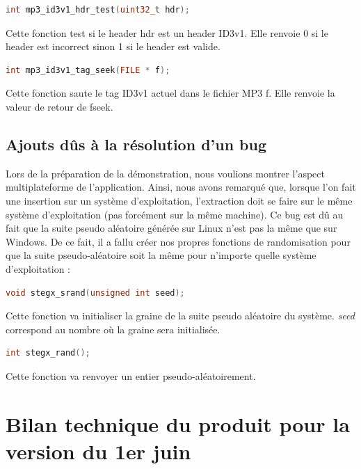 \documentclass[11pt]{article}
\begin{document}
\begin{lstlisting}[language=c]
int mp3_id3v1_hdr_test(uint32_t hdr);
\end{lstlisting}

Cette fonction test si le header hdr est un header ID3v1. Elle renvoie 0 
si le header est incorrect sinon 1 si le header est valide. 

\begin{lstlisting}[language=c]
int mp3_id3v1_tag_seek(FILE * f);
\end{lstlisting}

Cette fonction saute le tag ID3v1 actuel dans le fichier MP3 f. Elle renvoie 
la valeur de retour de fseek. 

\subsection{Ajouts dûs à la résolution d'un bug}

Lors de la préparation de la démonstration, nous voulions montrer l'aspect 
multiplateforme de l'application. 
Ainsi, nous avons remarqué que, lorsque l'on fait une insertion sur un 
système d'exploitation, l'extraction doit se faire sur le même système
d'exploitation (pas forcément sur la même machine). 
Ce bug est dû au fait que la suite pseudo aléatoire générée sur Linux n'est 
pas la même que sur Windows. 
De ce fait, il a fallu créer nos propres fonctions de randomisation pour que 
la suite pseudo-aléatoire soit la même pour n'importe quelle système d'exploitation : 

\begin{lstlisting}[language=c]
void stegx_srand(unsigned int seed);
\end{lstlisting}

Cette fonction va initialiser la graine de la suite pseudo aléatoire du 
système. \textit{seed} correspond au nombre où la graine sera initialisée.
\newline 

\begin{lstlisting}[language=c]
int stegx_rand();
\end{lstlisting}

Cette fonction va renvoyer un entier pseudo-aléatoirement. 

\section{Bilan technique du produit pour la version du 1er juin}
\end{document}
